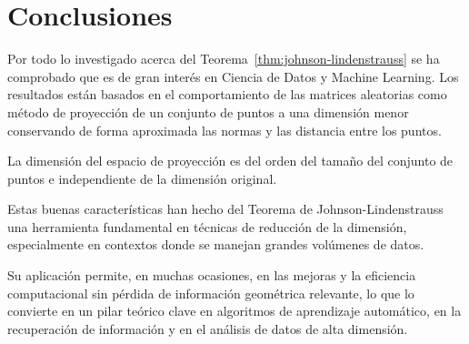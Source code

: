 \chapter{Conclusiones}

Por todo lo investigado acerca del Teorema~\ref{thm:johnson-lindenstrauss}
se ha comprobado que es de gran interés en Ciencia de Datos y Machine Learning.
Los resultados están basados en el comportamiento de las matrices aleatorias como
método de proyección de un conjunto de puntos a una dimensión menor conservando
de forma aproximada las normas y las distancia entre los puntos.

La dimensión del espacio de proyección es del orden del
tamaño del conjunto de puntos e independiente de la dimensión original.

Estas buenas características han hecho del Teorema de Johnson-Lindenstrauss
una herramienta fundamental en técnicas de reducción de la dimensión,
especialmente en contextos donde se manejan grandes volúmenes de datos.

Su aplicación permite, en muchas ocasiones, en las mejoras y la
eficiencia computacional sin pérdida de información geométrica relevante,
lo que lo convierte en un pilar teórico clave en algoritmos de aprendizaje
automático, en la recuperación de información y en el análisis de datos
de alta dimensión.
